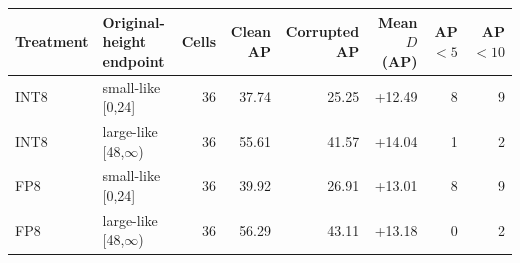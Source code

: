 \begin{tabular}{llrrrrrr}
\toprule
Treatment & Original-height endpoint & Cells & Clean AP & Corrupted AP & Mean $D$ (AP) & AP$<5$ & AP$<10$ \\
\midrule
INT8 & small-like [0,24] & 36 & 37.74 & 25.25 & +12.49 & 8 & 9 \\
INT8 & large-like [48,$\infty$) & 36 & 55.61 & 41.57 & +14.04 & 1 & 2 \\
FP8 & small-like [0,24] & 36 & 39.92 & 26.91 & +13.01 & 8 & 9 \\
FP8 & large-like [48,$\infty$) & 36 & 56.29 & 43.11 & +13.18 & 0 & 2 \\
\bottomrule
\end{tabular}
